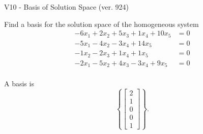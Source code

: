 \begin{exercise}
  \begin{exerciseTitle}V10 - Basis of Solution Space (ver. 924)\end{exerciseTitle}
  \begin{exerciseStatement}
    Find a basis for the solution space of the homogeneous system 
\begin{align*}
 -6 x_ 1 + 2 x_ 2 + 5 x_ 3 + 1 x_ 4 + 10 x_ 5 &= 0  \\ 
  -5 x_ 1 -4 x_ 2 -3 x_ 4 + 14 x_ 5 &= 0  \\ 
  -1 x_ 2 -2 x_ 3 + 1 x_ 4 + 1 x_ 5 &= 0  \\ 
  -2 x_ 1 -5 x_ 2 + 4 x_ 3 -3 x_ 4 + 9 x_ 5 &= 0  \\ 
 \end{align*}


 
  \end{exerciseStatement}

  \begin{exerciseAnswer}
   A basis is   
\[\left\{\left[\begin{array}{c}
2 \\
1 \\
0 \\
0 \\
1
\end{array}\right]\right\}.\]

  


  \end{exerciseAnswer}
\end{exercise}